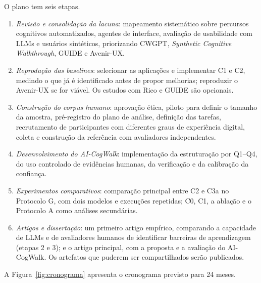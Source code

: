 \documentclass[12pt]{article}
\newcommand{\proj}{AI-CogWalk}
\begin{document}
O plano tem seis etapas.
\begin{enumerate}[noitemsep, topsep=3pt, leftmargin=1.5em]
  \item \textit{Revisão e consolidação da lacuna}: mapeamento sistemático \cite{kitchenham2007slr} sobre percursos cognitivos automatizados, agentes de interface, avaliação de usabilidade com LLMs e usuários sintéticos, priorizando CWGPT, \textit{Synthetic Cognitive Walkthrough}, GUIDE e Avenir-UX.
  \item \textit{Reprodução das baselines}: selecionar as aplicações e implementar C1 e C2, medindo o que já é identificado antes de propor melhorias; reproduzir o Avenir-UX se for viável. Os estudos com Rico e GUIDE são opcionais.
  \item \textit{Construção do corpus humano}: aprovação ética, piloto para definir o tamanho da amostra, pré-registro do plano de análise, definição das tarefas, recrutamento de participantes com diferentes graus de experiência digital, coleta e construção da referência com avaliadores independentes.
  \item \textit{Desenvolvimento do \proj}: implementação da estruturação por Q1--Q4, do uso controlado de evidências humanas, da verificação e da calibração da confiança.
  \item \textit{Experimentos comparativos}: comparação principal entre C2 e C3a no Protocolo G, com dois modelos e execuções repetidas; C0, C1, a ablação e o Protocolo A como análises secundárias.
  \item \textit{Artigos e dissertação}: um primeiro artigo empírico, comparando a capacidade de LLMs e de avaliadores humanos de identificar barreiras de aprendizagem (etapas 2 e 3); e o artigo principal, com a proposta e a avaliação do \proj. Os artefatos que puderem ser compartilhados serão publicados.
\end{enumerate}

A Figura~\ref{fig:cronograma} apresenta o cronograma previsto para 24 meses.
\end{document}
